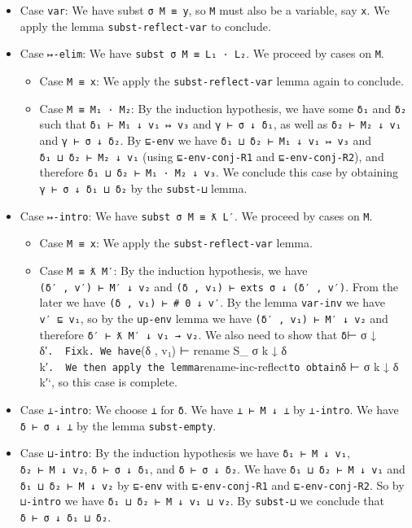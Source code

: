 \begin{itemize}
\item
  Case \texttt{var}: We have subst \texttt{σ\ M\ ≡\ y}, so \texttt{M}
  must also be a variable, say \texttt{x}. We apply the lemma
  \texttt{subst-reflect-var} to conclude.
\item
  Case \texttt{↦-elim}: We have \texttt{subst\ σ\ M\ ≡\ L₁\ ·\ L₂}. We
  proceed by cases on \texttt{M}.

  \begin{itemize}
  \item
    Case \texttt{M\ ≡\ x}: We apply the \texttt{subst-reflect-var} lemma
    again to conclude.
  \item
    Case \texttt{M\ ≡\ M₁\ ·\ M₂}: By the induction hypothesis, we have
    some \texttt{δ₁} and \texttt{δ₂} such that
    \texttt{δ₁\ ⊢\ M₁\ ↓\ v₁\ ↦\ v₃} and \texttt{γ\ ⊢\ σ\ ↓\ δ₁}, as
    well as \texttt{δ₂\ ⊢\ M₂\ ↓\ v₁} and \texttt{γ\ ⊢\ σ\ ↓\ δ₂}. By
    \texttt{⊑-env} we have \texttt{δ₁\ ⊔\ δ₂\ ⊢\ M₁\ ↓\ v₁\ ↦\ v₃} and
    \texttt{δ₁\ ⊔\ δ₂\ ⊢\ M₂\ ↓\ v₁} (using \texttt{⊑-env-conj-R1} and
    \texttt{⊑-env-conj-R2}), and therefore
    \texttt{δ₁\ ⊔\ δ₂\ ⊢\ M₁\ ·\ M₂\ ↓\ v₃}. We conclude this case by
    obtaining \texttt{γ\ ⊢\ σ\ ↓\ δ₁\ ⊔\ δ₂} by the \texttt{subst-⊔}
    lemma.
  \end{itemize}
\item
  Case \texttt{↦-intro}: We have \texttt{subst\ σ\ M\ ≡\ ƛ\ L′}. We
  proceed by cases on \texttt{M}.

  \begin{itemize}
  \item
    Case \texttt{M\ ≡\ x}: We apply the \texttt{subst-reflect-var}
    lemma.
  \item
    Case \texttt{M\ ≡\ ƛ\ M′}: By the induction hypothesis, we have
    \texttt{(δ′\ ,\ v′)\ ⊢\ M′\ ↓\ v₂} and
    \texttt{(δ\ ,\ v₁)\ ⊢\ exts\ σ\ ↓\ (δ′\ ,\ v′)}. From the later we
    have \texttt{(δ\ ,\ v₁)\ ⊢\ \#\ 0\ ↓\ v′}. By the lemma
    \texttt{var-inv} we have \texttt{v′\ ⊑\ v₁}, so by the
    \texttt{up-env} lemma we have \texttt{(δ′\ ,\ v₁)\ ⊢\ M′\ ↓\ v₂} and
    therefore \texttt{δ′\ ⊢\ ƛ\ M′\ ↓\ v₁\ →\ v₂}. We also need to show
    that \texttt{δ}⊢ σ ↓ δ′\texttt{.\ \ Fix}k\texttt{.\ We\ have}(δ ,
    v₁) ⊢ rename S\_ σ k ↓ δ
    k′\texttt{.\ \ We\ then\ apply\ the\ lemma}rename-inc-reflect\texttt{to\ obtain}δ
    ⊢ σ k ↓ δ k′`, so this case is complete.
  \end{itemize}
\item
  Case \texttt{⊥-intro}: We choose \texttt{⊥} for \texttt{δ}. We have
  \texttt{⊥\ ⊢\ M\ ↓\ ⊥} by \texttt{⊥-intro}. We have
  \texttt{δ\ ⊢\ σ\ ↓\ ⊥} by the lemma \texttt{subst-empty}.
\item
  Case \texttt{⊔-intro}: By the induction hypothesis we have
  \texttt{δ₁\ ⊢\ M\ ↓\ v₁}, \texttt{δ₂\ ⊢\ M\ ↓\ v₂},
  \texttt{δ\ ⊢\ σ\ ↓\ δ₁}, and \texttt{δ\ ⊢\ σ\ ↓\ δ₂}. We have
  \texttt{δ₁\ ⊔\ δ₂\ ⊢\ M\ ↓\ v₁} and \texttt{δ₁\ ⊔\ δ₂\ ⊢\ M\ ↓\ v₂} by
  \texttt{⊑-env} with \texttt{⊑-env-conj-R1} and \texttt{⊑-env-conj-R2}.
  So by \texttt{⊔-intro} we have \texttt{δ₁\ ⊔\ δ₂\ ⊢\ M\ ↓\ v₁\ ⊔\ v₂}.
  By \texttt{subst-⊔} we conclude that \texttt{δ\ ⊢\ σ\ ↓\ δ₁\ ⊔\ δ₂}.
\end{itemize}


